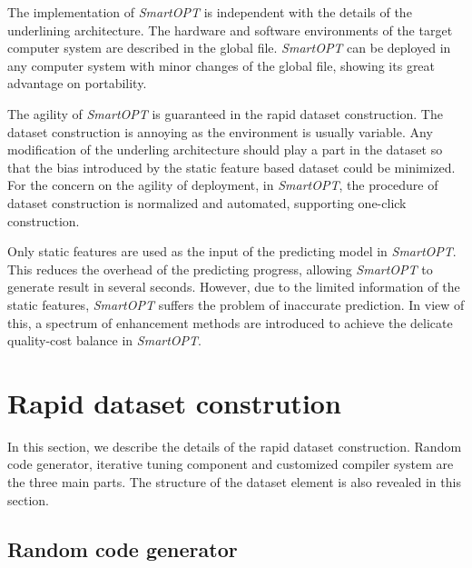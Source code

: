 \documentclass[bst/sn-mathphys]{sn-jnl}%
\theoremstyle{thmstyleone}%
\theoremstyle{thmstyletwo}%
\theoremstyle{thmstylethree}%
\begin{document}
The implementation of \emph{SmartOPT} is independent with the details of the 
underlining architecture. The hardware and software environments of the target 
computer system are described in the global file. \emph{SmartOPT} can be 
deployed in any computer system with minor changes of the global file, 
showing its great advantage on portability.

The agility of \emph{SmartOPT} is guaranteed in the rapid dataset construction. 
The dataset construction is annoying as the environment is usually variable. 
Any modification of the underling architecture should play a part in the 
dataset so that the bias introduced by the static feature based dataset could 
be minimized. For the concern on the agility of deployment, in \emph{SmartOPT},
the procedure of dataset construction is normalized and automated, supporting 
one-click construction. 

Only static features are used as the input of the predicting model in 
\emph{SmartOPT}. This reduces the overhead of the predicting progress, 
allowing \emph{SmartOPT} to generate result in several seconds. However, due 
to the limited information of the static features, \emph{SmartOPT} suffers the 
problem of inaccurate prediction. In view of this, a spectrum of enhancement 
methods are introduced to achieve the delicate quality-cost balance in 
\emph{SmartOPT}.

\section{Rapid dataset constrution}\label{sec4}

In this section, we describe the details of the rapid dataset construction. 
Random code generator, iterative tuning component and customized compiler 
system are the three main parts. The structure of the dataset element is also 
revealed in this section.

\subsection{Random code generator}\label{sec0401}

\end{document}
